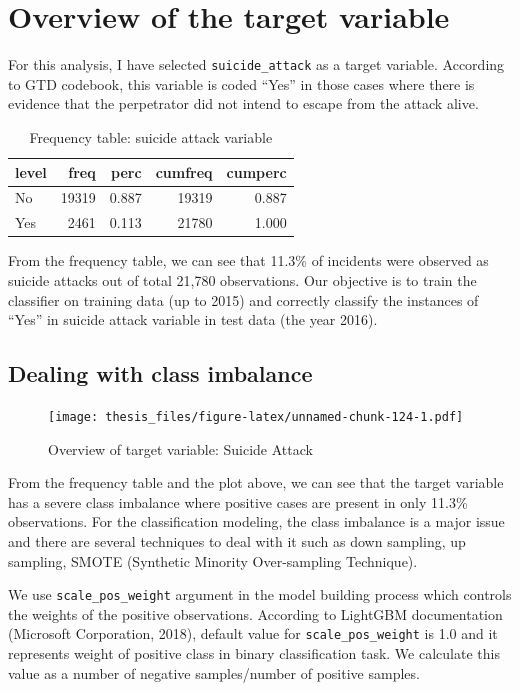 \documentclass[11pt,oneside,a4paper]{reedthesis}
\begin{document}
\section{Overview of the target
variable}\label{overview-of-the-target-variable}

For this analysis, I have selected \texttt{suicide\_attack} as a target
variable. According to GTD codebook, this variable is coded ``Yes'' in
those cases where there is evidence that the perpetrator did not intend
to escape from the attack alive.
\begin{table}[H]

\caption{\label{tab:unnamed-chunk-123}Frequency table: suicide attack variable}
\centering
\begin{tabular}[t]{lrrrr}
\toprule
level & freq & perc & cumfreq & cumperc\\
\midrule
No & 19319 & 0.887 & 19319 & 0.887\\
Yes & 2461 & 0.113 & 21780 & 1.000\\
\bottomrule
\end{tabular}
\end{table}
From the frequency table, we can see that 11.3\% of incidents were
observed as suicide attacks out of total 21,780 observations. Our
objective is to train the classifier on training data (up to 2015) and
correctly classify the instances of ``Yes'' in suicide attack variable
in test data (the year 2016).

\subsection{Dealing with class
imbalance}\label{dealing-with-class-imbalance}
\begin{figure}
\centering
\texttt{[image: thesis\_files/figure-latex/unnamed-chunk-124-1.pdf]}
\caption{\label{fig:unnamed-chunk-124}Overview of target variable: Suicide
Attack}
\end{figure}
From the frequency table and the plot above, we can see that the target
variable has a severe class imbalance where positive cases are present
in only 11.3\% observations. For the classification modeling, the class
imbalance is a major issue and there are several techniques to deal with
it such as down sampling, up sampling, SMOTE (Synthetic Minority
Over-sampling Technique).

We use \texttt{scale\_pos\_weight} argument in the model building
process which controls the weights of the positive observations.
According to LightGBM documentation (Microsoft Corporation, 2018),
default value for \texttt{scale\_pos\_weight} is 1.0 and it represents
weight of positive class in binary classification task. We calculate
this value as a number of negative samples/number of positive samples.
\end{document}
